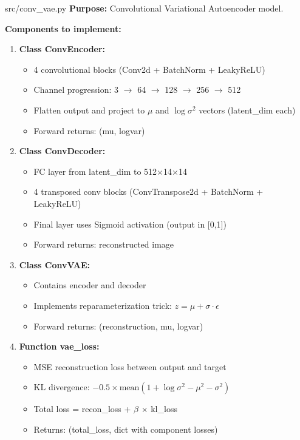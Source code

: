 \documentclass[11pt,a4paper]{article}
\begin{document}
\newpage

\begin{filebox}{src/conv\_vae.py}
\textbf{Purpose:} Convolutional Variational Autoencoder model.

\textbf{Components to implement:}
\begin{enumerate}[noitemsep]
    \item \textbf{Class ConvEncoder:}
    \begin{itemize}[noitemsep]
        \item 4 convolutional blocks (Conv2d + BatchNorm + LeakyReLU)
        \item Channel progression: 3 $\rightarrow$ 64 $\rightarrow$ 128 $\rightarrow$ 256 $\rightarrow$ 512
        \item Flatten output and project to $\mu$ and $\log\sigma^2$ vectors (latent\_dim each)
        \item Forward returns: (mu, logvar)
    \end{itemize}
    \item \textbf{Class ConvDecoder:}
    \begin{itemize}[noitemsep]
        \item FC layer from latent\_dim to 512$\times$14$\times$14
        \item 4 transposed conv blocks (ConvTranspose2d + BatchNorm + LeakyReLU)
        \item Final layer uses Sigmoid activation (output in [0,1])
        \item Forward returns: reconstructed image
    \end{itemize}
    \item \textbf{Class ConvVAE:}
    \begin{itemize}[noitemsep]
        \item Contains encoder and decoder
        \item Implements reparameterization trick: $z = \mu + \sigma \cdot \epsilon$
        \item Forward returns: (reconstruction, mu, logvar)
    \end{itemize}
    \item \textbf{Function vae\_loss:}
    \begin{itemize}[noitemsep]
        \item MSE reconstruction loss between output and target
        \item KL divergence: $-0.5 \times \text{mean}(1 + \log\sigma^2 - \mu^2 - \sigma^2)$
        \item Total loss = recon\_loss + $\beta$ $\times$ kl\_loss
        \item Returns: (total\_loss, dict with component losses)
    \end{itemize}
\end{enumerate}
\end{filebox}
\end{document}
